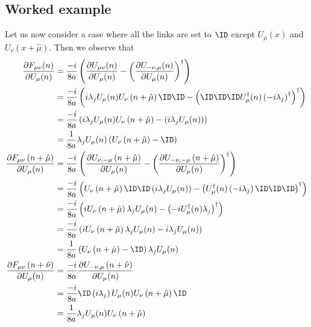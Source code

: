 	\subsection{Worked example}
	Let us now consider a case where all the links are set to $\ID$ except $U_\mu(x)$ and $U_\nu\left(x+\hat{\mu}\right)$.
	Then we observe that
	\begin{align}
		\frac{\partial F_{\mu\nu}(n)}{\partial U_\mu(n)}&= \frac{-i}{8a}\left(\frac{\partial U_{\mu\nu}(n)}{\partial
		U_\mu(n)}-\left(\frac{\partial U_{-\nu,\mu}(n)}{\partial U_\mu(n)}\right)^\dagger\right)\nonumber\\ & =
		\frac{-i}{8a}\left(i\lambda_jU_\mu(n)U_\nu\left(n+\hat{\mu}\right)\ID\ID-\left(\ID\ID\ID
		U^\dagger_\mu(n)\left(-i\lambda_j\right)^\dagger\right)^\dagger\right)\nonumber\\&= \frac{-i}{8a}\left(i\lambda_j
		U_\mu(n)U_\nu\left(n+\hat{\mu}\right)-\left(i\lambda_j U_\mu(n)\right)\right)\nonumber\\&=
		\frac{1}{8a}\lambda_j U_\mu(n)\left(U_\nu\left(n+\hat{\mu}\right)-\ID\right)\label{Eq:WE1}\\
		\frac{\partial F_{\mu\nu}\left(n+\hat{\mu}\right)}{\partial U_\mu(n)}&=
		\frac{-i}{8a}\left(\frac{\partial U_{\nu,-\mu}\left(n+\hat{\mu}\right)}{\partial U_\mu(n)}-\left(\frac{\partial
		U_{-\nu,-\mu}\left(n+\hat{\mu}\right)}{\partial U_\mu(n)}\right)^\dagger\right)\nonumber\\&=
		\frac{-i}{8a}\left(U_\nu\left(n+\hat{\mu}\right)\ID\ID\left(i\lambda_j
		U_\mu(n)\right)-\left(U^\dagger_\mu(n)\left(-i\lambda_j\right)\ID\ID\ID\right)^\dagger\right)\nonumber\\&=
		\frac{-i}{8a}\left(iU_\nu\left(n+\hat{\mu}\right)\lambda_jU_\mu(n)-\left(-iU^\dagger_\mu(n)\lambda_j\right)^\dagger\right)\nonumber\\&=
		\frac{-i}{8a}\left(iU_\nu\left(n+\hat{\mu}\right)\lambda_jU_\mu(n)-i\lambda_jU_\mu(n)\right)\nonumber\\&=
		\frac{1}{8a}\left(U_\nu\left(n+\hat{\mu}\right)-\ID\right)\lambda_j U_\mu(n)\label{Eq:WE2}\\
		\frac{\partial F_{\mu\nu}\left(n+\hat{\nu}\right)}{\partial U_\mu(n)}&=
		\frac{-i}{8a}\frac{\partial U_{-\nu,\mu}\left(n+\hat{\nu}\right)}{\partial U_\mu(n)}\nonumber\\&=
		\frac{-i}{8a}\ID\left(i\lambda_j\right)U_\mu(n)U_\nu\left(n+\hat{\mu}\right)\ID\nonumber\\&=
		\frac{1}{8a}\lambda_j U_\mu(n)U_\nu\left(n+\hat{\mu}\right)\label{Eq:WE3}\\

\end{align}
